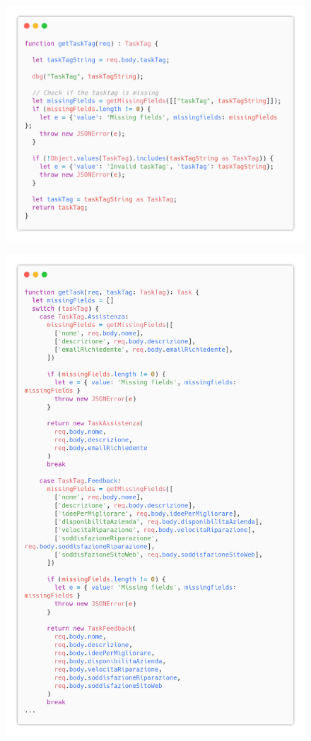 \documentclass{report}
\begin{document}
\begin{figure}[H]
	\centering\includegraphics[width=1\textwidth]{images/code_crea_task2.png}
\end{figure}
\begin{figure}[H]
	\centering\includegraphics[width=1\textwidth]{images/code_crea_task3.png}
\end{figure}
\end{document}

